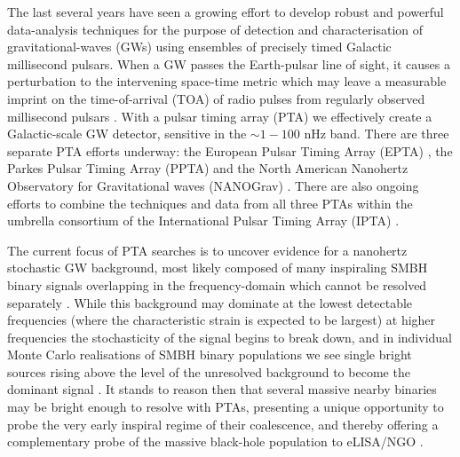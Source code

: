 \documentclass[prd,twocolumn,showpacs,nofootinbib]{revtex4}
\begin{document}
The last several years have seen a growing effort to develop robust and powerful data-analysis techniques for the purpose of detection and characterisation of gravitational-waves (GWs) using ensembles of precisely timed Galactic millisecond pulsars. When a GW passes the Earth-pulsar line of sight, it causes a perturbation to the intervening space-time metric which may leave a measurable imprint on the time-of-arrival (TOA) of radio pulses from regularly observed millisecond pulsars \citep{burke-1975,sazhin-1978,detweiler-1979,estabrook-1975}. With a pulsar timing array (PTA) \citep{foster-backer-1990} we effectively create a Galactic-scale GW detector, sensitive in the $\sim 1-100$ nHz band. %
There are three separate PTA efforts underway: the European Pulsar Timing Array (EPTA) \citep{eptareview2013}, the Parkes Pulsar Timing Array (PPTA) \citep{parkesreview2013} and the North American Nanohertz Observatory for Gravitational waves (NANOGrav) \citep{nanogravreview2013}. There are also ongoing efforts to combine the techniques and data from all three PTAs within the umbrella consortium of the International Pulsar Timing Array (IPTA) \citep{iptareview2013}.

The current focus of PTA searches is to uncover evidence for a nanohertz stochastic GW background, most likely composed of many inspiraling SMBH binary signals overlapping in the frequency-domain which cannot be resolved separately \citep{rajaromani1995,jaffe-backer-2003,wyithe-loeb-2003}. While this background may dominate at the lowest detectable frequencies (where the characteristic strain is expected to be largest) at higher frequencies the stochasticity of the signal begins to break down, and in individual Monte Carlo realisations of SMBH binary populations we see single bright sources rising above the level of the unresolved background to become the dominant signal \citep{sesana-vecchio-colacino-2008,sesana-vecchio-volonteri-2009,ravi-2012}. It stands to reason then that several massive nearby binaries may be bright enough to resolve with PTAs, presenting a unique opportunity to probe the very early inspiral regime of their coalescence, and thereby offering a complementary probe of the massive black-hole population to eLISA/NGO \citep[e.g.,][]{sesana-review-2013-1,wenjenet2011}. 
\end{document}
